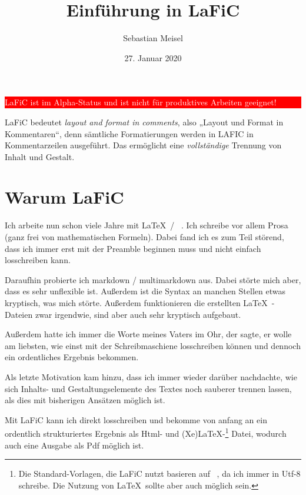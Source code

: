 \documentclass{scrartcl}
\author{Sebastian Meisel}
\date{27. Januar 2020}
\title{Einführung in LaFiC}
\begin{document}
\maketitle


\colorbox{red}{\parbox{\linewidth}{%
\begin{center}
\textcolor{white}{%
LaFiC ist im Alpha-Status und ist nicht für produktives Arbeiten geeignet!}
\end{center}

}
}

{LaFiC bedeutet \textit{layout and format in comments}, also „Layout
und Format in Kommentaren“, denn sämtliche Formatierungen
werden in LAFIC in Kommentarzeilen ausgeführt. Das
ermöglicht eine \emph{vollständige} Trennung von Inhalt und
Gestalt.\\}

\section{Warum LaFiC}

{Ich arbeite nun schon viele Jahre mit \LaTeX\  / \XeLaTeX\ . Ich
schreibe vor allem Prosa (ganz frei von mathematischen
Formeln). Dabei fand ich es zum Teil störend, dass ich immer
erst mit der Preamble beginnen muss und nicht einfach
losschreiben kann.\\}

{Daraufhin probierte ich markdown / multimarkdown aus. Dabei
störte mich aber, dass es sehr unflexible ist. Außerdem ist
die Syntax an manchen Stellen etwas kryptisch, was mich
störte. Außerdem funktionieren die erstellten \LaTeX\ -Dateien
zwar irgendwie, sind aber auch sehr kryptisch aufgebaut.\\}

{Außerdem hatte ich immer die Worte meines Vaters im Ohr, der
sagte, er wolle am liebsten, wie einst mit der
Schreibmaschiene losschreiben können und dennoch ein
ordentliches Ergebnis bekommen.\\}

{Als letzte Motivation kam hinzu, dass ich immer wieder
darüber nachdachte, wie sich Inhalts- und
Gestaltungselemente des Textes noch sauberer trennen lassen,
als dies mit bisherigen Ansätzen möglich ist.\\}

{Mit LaFiC kann ich direkt losschreiben und bekomme von
anfang an ein ordentlich strukturiertes Ergebnis als Html-
und (Xe)LaTeX-\footnote{Die Standard-Vorlagen, die LaFiC nutzt basieren auf \XeLaTeX\ , da ich immer in Utf-8 schreibe. Die Nutzung von \LaTeX\  sollte aber auch möglich sein.}\xspace Datei, wodurch auch eine Ausgabe als Pdf
möglich ist.\\}
\end{document}
